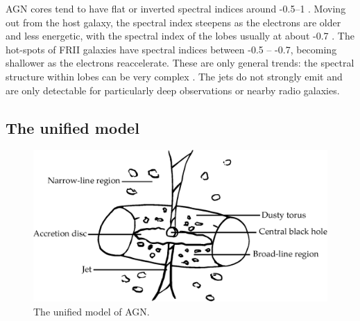 \documentclass[11pt, a4paper]{book}
\begin{document}
        AGN cores tend to have flat or inverted spectral indices around -0.5--1 \citep{condon_essential_2016,randall_spectral_2012}. Moving out from the host galaxy, the spectral index steepens as the electrons are older and less energetic, with the spectral index of the lobes usually at about -0.7 \citep{condon_essential_2016}. The hot-spots of FRII galaxies have spectral indices between -0.5 -- -0.7, becoming shallower as the electrons reaccelerate. These are only general trends: the spectral structure within lobes can be very complex \citep{treichel_spectral_2001}. The jets do not strongly emit and are only detectable for particularly deep observations or nearby radio galaxies.

    \subsection{The unified model}
    \label{sec:unified-model}

        \begin{figure}
            \centering
            \includegraphics[width=\textwidth]{images/agn.eps}
            \caption{\label{fig:agn} The unified model of AGN.}
        \end{figure}
\end{document}
